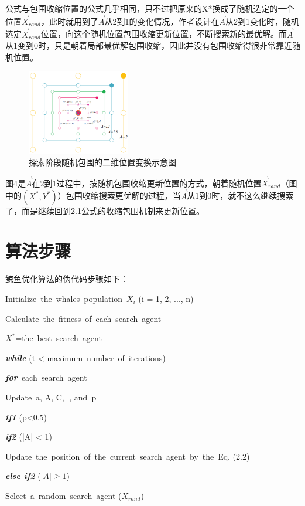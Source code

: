 \documentclass[12pt,a4paper]{article}
\begin{document}
公式与包围收缩位置的公式几乎相同，只不过把原来的X*换成了随机选定的一个位置$\vec{X}_{rand}$，此时就用到了$\vec{A}$从2到1的变化情况，作者设计在$\vec{A}$从2到1变化时，随机选定$\vec{X}_{rand}$位置，向这个随机位置包围收缩更新位置，不断搜索新的最优解。而$\vec{A}$从1变到0时，只是朝着局部最优解包围收缩，因此并没有包围收缩得很非常靠近随机位置。
\begin{figure}[H]
\centering
\includegraphics[width=0.4\textwidth]{figure/exploration.png}
\renewcommand\figurename{图}\caption{探索阶段随机包围的二维位置变换示意图}
\end{figure}

图4是$\vec{A}$在2到1过程中，按随机包围收缩更新位置的方式，朝着随机位置$\vec{X}_{rand}$（图中的$(X^*,Y^*)$）包围收缩搜索更优解的过程，当$\vec{A}$从1到0时，就不这么继续搜索了，而是继续回到2.1公式的收缩包围机制来更新位置。

\section{算法步骤}
鲸鱼优化算法的伪代码步骤如下：

Initialize\ the\ whales\ population\ $X_{i}$ (i = 1, 2, ..., n)

 Calculate\ the\ fitness\ of\ each\ search\ agent
 
 $X^{*}$=the\ best\ search\ agent
 
 \textbf{\emph{while}} (t < maximum\ number\ of\ iterations)
 
 \qquad \textbf{\emph{for}}\ each\ search\ agent
 
 \qquad Update\ a, A, C, l, and\ p
 
 \qquad \qquad \textbf{\emph{if1}} (p<0.5)
 
 \qquad \qquad \qquad \textbf{\emph{if2}} (|A| < 1)
 
 \qquad \qquad \qquad \qquad Update\ the\ position\ of\ the\ current\ search\ agent\ by\ the\ Eq. (2.2)
 
 \qquad \qquad \qquad \textbf{\emph{else if2}} ($|A|\geq 1$)
 
 \qquad \qquad \qquad \qquad Select\ a\ random\ search\ agent ($X_{rand}$)
 
\end{document}
